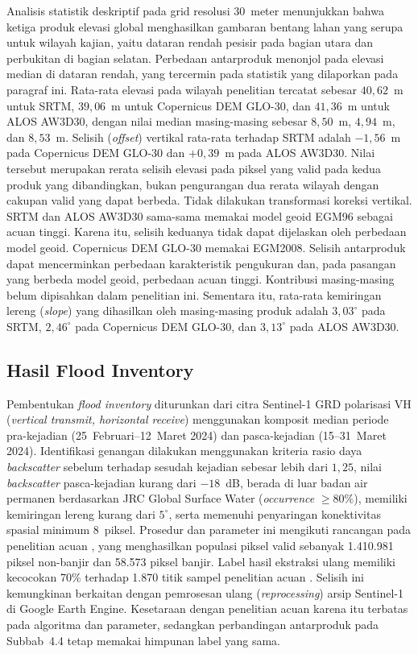 \documentclass[12pt]{article}
\begin{document}
Analisis statistik deskriptif pada grid resolusi 30~meter menunjukkan bahwa
ketiga produk elevasi global menghasilkan gambaran bentang lahan yang serupa
untuk wilayah kajian, yaitu dataran rendah pesisir pada bagian utara dan
perbukitan di bagian selatan. Perbedaan antarproduk menonjol pada elevasi
median di dataran rendah, yang tercermin pada statistik yang dilaporkan pada
paragraf ini.
Rata-rata elevasi pada wilayah penelitian tercatat sebesar $40{,}62$~m untuk
SRTM, $39{,}06$~m untuk Copernicus DEM GLO-30, dan $41{,}36$~m untuk ALOS
AW3D30, dengan nilai median masing-masing sebesar $8{,}50$~m, $4{,}94$~m, dan
$8{,}53$~m. Selisih (\textit{offset}) vertikal rata-rata terhadap SRTM adalah
$-1{,}56$~m pada Copernicus DEM GLO-30 dan $+0{,}39$~m pada ALOS AW3D30. Nilai
tersebut merupakan rerata selisih elevasi pada piksel yang valid pada
kedua produk yang dibandingkan, bukan pengurangan dua rerata wilayah
dengan cakupan valid yang dapat berbeda. Tidak dilakukan transformasi
koreksi vertikal. SRTM dan ALOS AW3D30 sama-sama memakai model geoid EGM96
sebagai acuan tinggi. Karena itu, selisih keduanya tidak dapat dijelaskan
oleh perbedaan model geoid. Copernicus DEM GLO-30 memakai EGM2008.
Selisih antarproduk dapat mencerminkan perbedaan karakteristik pengukuran
dan, pada pasangan yang berbeda model geoid, perbedaan acuan tinggi.
Kontribusi masing-masing belum dipisahkan dalam penelitian ini.
Sementara itu, rata-rata
kemiringan lereng (\textit{slope}) yang dihasilkan oleh masing-masing produk
adalah $3{,}03^{\circ}$ pada SRTM, $2{,}46^{\circ}$ pada Copernicus DEM GLO-30,
dan $3{,}13^{\circ}$ pada ALOS AW3D30.

\subsection{Hasil Flood Inventory}

Pembentukan \textit{flood inventory} diturunkan dari citra Sentinel-1 GRD
polarisasi VH (\textit{vertical transmit, horizontal receive}) menggunakan komposit median periode pra-kejadian
(25~Februari--12~Maret 2024) dan pasca-kejadian (15--31~Maret 2024).
Identifikasi genangan dilakukan menggunakan kriteria rasio daya
\textit{backscatter} sebelum terhadap sesudah kejadian sebesar lebih dari
$1{,}25$, nilai \textit{backscatter} pasca-kejadian kurang dari $-18$~dB,
berada di luar badan air permanen berdasarkan JRC Global Surface Water
(\textit{occurrence} $\geq 80\%$), memiliki kemiringan lereng kurang dari
$5^{\circ}$, serta memenuhi penyaringan konektivitas spasial minimum 8~piksel.
Prosedur dan parameter ini mengikuti rancangan pada penelitian acuan
\cite{hakim2026}, yang menghasilkan populasi piksel valid sebanyak 1.410.981
piksel non-banjir dan 58.573 piksel banjir. Label hasil ekstraksi ulang memiliki kecocokan 70\% terhadap 1.870 titik
sampel penelitian acuan \cite{hakim2026}. Selisih ini kemungkinan berkaitan
dengan pemrosesan ulang (\textit{reprocessing}) arsip Sentinel-1 di Google
Earth Engine. Kesetaraan dengan penelitian acuan karena itu terbatas pada
algoritma dan parameter, sedangkan perbandingan antarproduk pada
Subbab~4.4 tetap memakai himpunan label yang sama.
\end{document}

